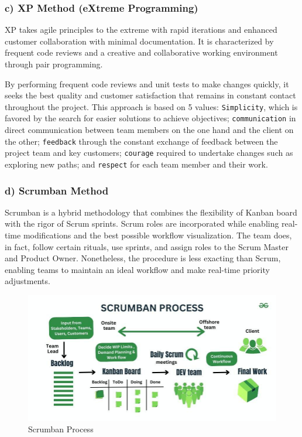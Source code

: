 \subsubsection{c) XP Method (eXtreme Programming)}

XP takes agile principles to the extreme with rapid iterations and enhanced customer collaboration with minimal documentation. It is characterized by frequent code reviews and a creative and collaborative working environment through pair programming\cite{beck2000extreme}. 


By performing frequent code reviews and unit tests to make changes quickly, it seeks the best quality and customer satisfaction that remains in constant contact throughout the project. This approach is based on 5 values: \texttt{Simplicity}, which is favored by the search for easier solutions to achieve objectives; \texttt{communication} in direct communication between team members on the one hand and the client on the other; \texttt{feedback} through the constant exchange of feedback between the project team and key customers; \texttt{courage} required to undertake changes such as exploring new paths; and \texttt{respect} for each team member and their work.


\subsubsection{d) Scrumban Method}
Scrumban is a hybrid methodology that combines the flexibility of Kanban board with the rigor of Scrum sprints. Scrum roles are incorporated while enabling real-time modifications and the best possible workflow visualization. The team does, in fact, follow certain rituals, use sprints, and assign roles to the Scrum Master and Product Owner. Nonetheless, the procedure is less exacting than Scrum, enabling teams to maintain an ideal workflow and make real-time priority adjustments.

\begin{center}
\begin{figure}[H]
            \centering
            \includegraphics[scale=0.44]{images/scrumban.jpg}
            \caption{Scrumban Process }
            \label{fig:Scrumban_Process}
\end{figure}
\end{center}   


